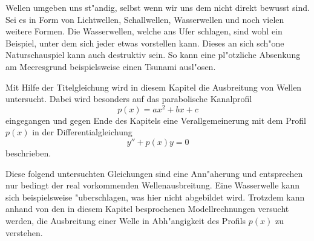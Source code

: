 Wellen umgeben uns st"andig, selbst wenn wir uns dem nicht direkt bewusst sind. 
Sei es in Form von Lichtwellen, Schallwellen, Wasserwellen und noch vielen 
weitere Formen. Die Wasserwellen, welche ans Ufer schlagen, sind wohl ein 
Beispiel, unter dem sich jeder etwas vorstellen kann. Dieses an sich sch"one 
Naturschauspiel kann auch destruktiv sein. So kann eine pl"otzliche Absenkung 
am Meeresgrund beispielsweise einen Tsunami ausl"osen.

Mit Hilfe der Titelgleichung wird in diesem Kapitel die Ausbreitung von Wellen 
untersucht. Dabei wird besonders auf das parabolische Kanalprofil
\begin{equation*}
	p(x) = ax^2+bx+c
\end{equation*}
eingegangen und gegen Ende des Kapitels eine Verallgemeinerung mit dem Profil 
$p(x)$ in der Differentialgleichung
\begin{equation}
	y'' + p(x) y = 0
	\label{eq:wellen:pxdgl}
\end{equation}
beschrieben.

Diese folgend untersuchten Gleichungen sind eine Ann"aherung und entsprechen 
nur bedingt der real vorkommenden Wellenausbreitung. Eine Wasserwelle 
kann sich beispielsweise "uberschlagen, was hier nicht abgebildet wird. 
Trotzdem kann anhand von den in diesem Kapitel besprochenen Modellrechnungen 
versucht werden, die Ausbreitung einer Welle in Abh"angigkeit des Profils 
$p(x)$ zu verstehen.
